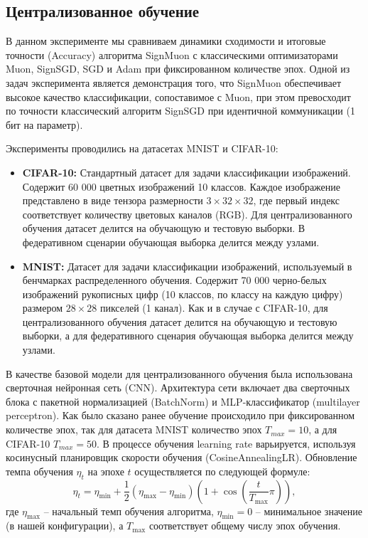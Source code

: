 \documentclass{article}
\begin{document}
\subsection{Централизованное обучение}
В данном эксперименте мы сравниваем динамики сходимости и итоговые точности (Accuracy) алгоритма SignMuon с классическими оптимизаторами Muon, SignSGD, SGD и Adam при фиксированном количестве эпох. Одной из задач эксперимента является демонстрация того, что SignMuon обеспечивает высокое качество классификации, сопоставимое с Muon, при этом превосходит по точности классический алгоритм SignSGD при идентичной коммуникации (1 бит на параметр).  

Эксперименты проводились на датасетах MNIST и CIFAR-10:
\begin{itemize}
    \item \textbf{CIFAR-10:} Стандартный датасет для задачи классификации изображений. Содержит 60 000 цветных изображений 10 классов. Каждое изображение представлено в виде тензора размерности $3 \times 32 \times 32$, где первый индекс соответствует количеству цветовых каналов (RGB). Для централизованного обучения датасет делится на обучающую и тестовую выборки. В федеративном сценарии обучающая выборка делится между узлами.
    \item \textbf{MNIST:} Датасет для задачи классификации изображений, используемый в бенчмарках распределенного обучения. Содержит 70 000 черно-белых изображений рукописных цифр (10 классов, по классу на каждую цифру) размером $28 \times 28$ пикселей (1 канал). Как и в случае с CIFAR-10, для централизованного обучения датасет делится на обучающую и тестовую выборки, а для федеративного сценария обучающая выборка делится между узлами.
\end{itemize}

В качестве базовой модели для централизованного обучения была использована сверточная нейронная сеть (CNN). Архитектура сети включает два сверточных блока с пакетной нормализацией (BatchNorm) и MLP-классификатор (multilayer perceptron). Как было сказано ранее обучение происходило при фиксированном количестве эпох, так для датасета MNIST количество эпох $T_{max}=10$, а для CIFAR-10 $T_{max}=50$. В процессе обучения learning rate варьируется, используя косинусный планировщик скорости обучения (CosineAnnealingLR). Обновление темпа обучения $\eta_t$ на эпохе $t$ осуществляется по следующей формуле:
\begin{equation}
\eta_t = \eta_{\text{min}} + \frac{1}{2}(\eta_{\text{max}} - \eta_{\text{min}})\left(1 + \cos\left(\frac{t}{T_{\text{max}}}\pi\right)\right),
\end{equation}
где $\eta_{\text{max}}$ -- начальный темп обучения алгоритма, $\eta_{\text{min}} = 0$ -- минимальное значение (в нашей конфигурации), а $T_{\text{max}}$ соответствует общему числу эпох обучения. 
\end{document}
